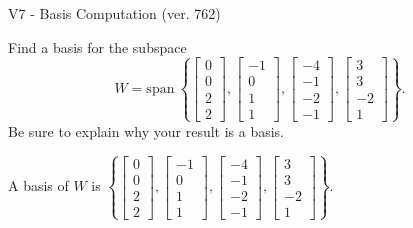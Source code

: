 \begin{exercise}
  \begin{exerciseTitle}V7 - Basis Computation (ver. 762)\end{exerciseTitle}
  \begin{exerciseStatement}
    Find a basis for the subspace 
\[W=\mathrm{span}\ \left\{\left[\begin{array}{r}
0 \\
0 \\
2 \\
2
\end{array}\right] , \left[\begin{array}{r}
-1 \\
0 \\
1 \\
1
\end{array}\right] , \left[\begin{array}{r}
-4 \\
-1 \\
-2 \\
-1
\end{array}\right] , \left[\begin{array}{r}
3 \\
3 \\
-2 \\
1
\end{array}\right]\right\}.\]
 Be sure to explain why your result is a basis.


  \end{exerciseStatement}
  \begin{exerciseAnswer}
   A basis of \(W\) is  \(\left\{\left[\begin{array}{r}
0 \\
0 \\
2 \\
2
\end{array}\right] , \left[\begin{array}{r}
-1 \\
0 \\
1 \\
1
\end{array}\right] , \left[\begin{array}{r}
-4 \\
-1 \\
-2 \\
-1
\end{array}\right] , \left[\begin{array}{r}
3 \\
3 \\
-2 \\
1
\end{array}\right]\right\}\).
  


  \end{exerciseAnswer}
\end{exercise}